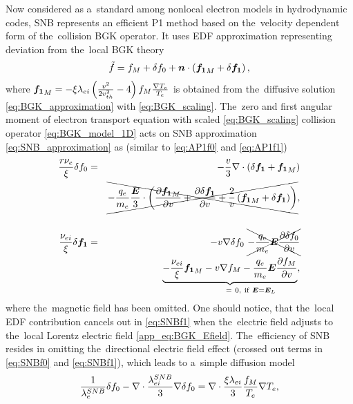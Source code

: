 Now considered as a~standard among nonlocal electron models in hydrodynamic 
codes, SNB \cite{Schurtz_2000} represents an efficient P1 method based on
the~velocity dependent form of the~collision BGK operator. It uses EDF 
approximation representing deviation from the~local BGK theory
\begin{equation}
  \tilde{f} = 
  f_M + \delta f_0 
  + \boldsymbol{n}\cdot\left({\boldsymbol{f_1}}_M + \delta{\boldsymbol{f_1}}\right) , 
  \label{eq:SNB_approximation}
\end{equation}
where ${\boldsymbol{f_1}}_M = - \xi\lambda_{ei}\left( \frac{v^2}{2 v_{th}^2} - 4\right)f_M
\frac{\nabla T_e}{T_e}$ is obtained from the~diffusive solution 
\eqref{eq:BGK_approximation} with \eqref{eq:BGK_scaling}.
The~zero and first angular moment of electron transport equation 
with scaled \eqref{eq:BGK_scaling} collision operator \eqref{eq:BGK_model_1D} 
acts on SNB approximation \eqref{eq:SNB_approximation} 
as (similar to \eqref{eq:AP1f0} and \eqref{eq:AP1f1})
\begin{eqnarray}
  \frac{r \nu_{e}}{\xi}\delta f_0 &=&
  - \frac{v}{3}\nabla\cdot\left(\delta{\boldsymbol{f_1}} + {\boldsymbol{f_1}}_M\right)
  \nonumber\\ 
  &&\xcancel{- \frac{q_e}{m_e}\frac{\boldsymbol{E}}{3}\cdot\left(
  \frac{\partial{{\boldsymbol{f_1}}_M}}{\partial{v}} + \frac{\partial{\delta{\boldsymbol{f_1}}}}{\partial{v}} 
  + \frac{2}{v}\left({\boldsymbol{f_1}}_M + \delta{\boldsymbol{f_1}}\right)\right)} , 
  \nonumber \\
  \label{eq:SNBf0}\\
  \frac{\nu_{ei}}{\xi}\delta{\boldsymbol{f_1}} &=& - v\nabla\delta f_0 
  ~\xcancel{- \frac{q_e}{m_e}\boldsymbol{E}\frac{\partial{\delta f_0}}{\partial{v}}} 
  \nonumber \\
  &&\underbrace{- \frac{\nu_{ei}}{\xi}{\boldsymbol{f_1}}_M - v\nabla f_M
  - \frac{q_e}{m_e}\boldsymbol{E}\frac{\partial{f_M}}{\partial{v}}}_{~~~~~~~~~~~~~=~0,~\text{if}~\boldsymbol{E} = \boldsymbol{E}_L} 
  ,
  \nonumber \\
  \label{eq:SNBf1}
\end{eqnarray}
where the~magnetic field has been omitted. One should notice, that the~local
EDF contribution cancels out in \eqref{eq:SNBf1} when the~electric field 
adjusts to the~local Lorentz electric field \eqref{app_eq:BGK_Efield}. 
The~efficiency of SNB resides in omitting the~directional electric field 
effect (crossed out terms in \eqref{eq:SNBf0} and \eqref{eq:SNBf1}), which
leads to a~simple diffusion model 
\begin{equation}
  \frac{1}{\lambda_e^{SNB}}\delta f_0 
  - \nabla\cdot\frac{\lambda_{ei}^{SNB}}{3}\nabla\delta f_0 =
  \nabla\cdot\frac{\xi\lambda_{ei}}{3}\frac{f_M}{T_e}\nabla T_e
  ,
  \label{eq:SNB_model}
\end{equation}
